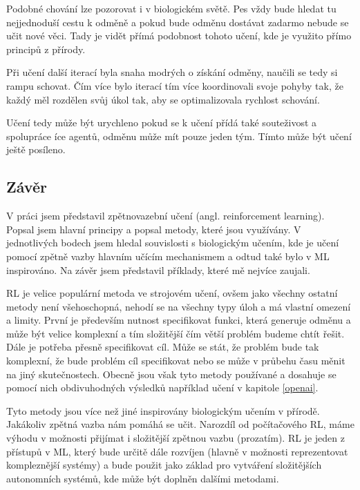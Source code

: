 \documentclass{article}
\begin{document}
Podobné chování lze pozorovat i v biologickém světě. Pes vždy bude hledat tu nejjednoduší cestu k odměně a pokud bude odměnu dostávat zadarmo nebude se učit nové věci. Tady je vidět přímá podobnost tohoto učení, kde je využito přímo principů z přírody.

Při učení další iterací byla snaha modrých o získání odměny, naučili se tedy si rampu schovat. Čím více bylo iterací tím více koordinovali svoje pohyby tak, že každý měl rozdělen svůj úkol tak, aby se optimalizovala rychlost schování. 

Učení tedy může být urychleno pokud se k učení přídá také souteživost a spolupráce íce agentů, odměnu může mít pouze jeden tým. Tímto může být učení ještě posíleno.

\subsection{Závěr} 

V práci jsem představil zpětnovazební učení (angl. reinforcement learning). Popsal jsem hlavní principy a popsal metody, které jsou využívány. V jednotlivých bodech jsem hledal souvislosti s biologickým učením, kde je učení pomocí zpětně vazby hlavním učícím mechanismem a odtud také bylo v ML inspirováno. Na závěr jsem představil příklady, které mě nejvíce zaujali.

RL je velice populární metoda ve strojovém učení, ovšem jako všechny ostatní metody není všehoschopná, nehodí se na všechny typy úloh a má vlastní omezení a limity. První je především nutnost specifikovat funkci, která generuje odměnu a může být velice komplexní a tím složitější čím větší problém budeme chtít řešit. Dále je potřeba přesně specifikovat cíl. Může se stát, že problém bude tak komplexní, že bude problém cíl specifikovat nebo se může v průbehu času měnit na jiný skutečnostech. Obecně jsou však tyto metody používané a dosahuje se pomocí nich obdivuhodných výsledků například učení v kapitole \ref{openai}. 

Tyto metody jsou více než jiné inspirovány biologickým učením v přírodě. Jakákoliv zpětná vazba nám pomáhá se učit. Narozdíl od počítačového RL, máme výhodu v možnosti přijímat i složitější zpětnou vazbu (prozatím). RL je jeden z přístupů v ML, který bude určitě dále rozvíjen (hlavně v možnosti reprezentovat kompleznější systémy) a bude použit jako základ pro vytváření složitějších autonomních systémů, kde může být doplněn dalšími metodami.

  
  
\end{document}
